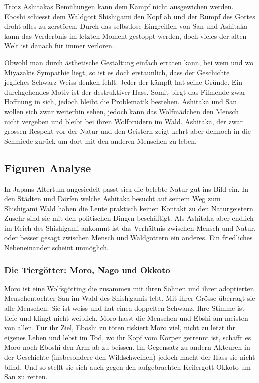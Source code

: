 Trotz Ashitakas Bemühungen kann dem Kampf nicht ausgewichen werden. Eboshi schiesst dem Waldgott Shishigami den Kopf ab und der Rumpf des Gottes droht alles zu zerstören. Durch das selbstlose Eingreiffen von San und Ashitaka kann das Verderbnis im letzten Moment gestoppt werden, doch vieles der alten Welt ist danach für immer verloren.

Obwohl man durch ästhetische Gestaltung einfach erraten kann, bei wem und wo Miyazakis Sympathie liegt, so ist es doch erstaunlich, dass der Geschichte jegliches Schwarz-Weiss denken fehlt. Jeder der kämpft hat seine Gründe. Ein durchgehendes Motiv ist der destruktiver Hass. Somit birgt das Filmende zwar Hoffnung in sich, jedoch bleibt die Problematik bestehen. Ashitaka und San wollen sich zwar weiterhin sehen, jedoch kann das Wolfmädchen den Mensch nicht vergeben und bleibt bei ihren Wolfbrüdern im Wald. Ashitaka, der zwar grossen Respekt vor der Natur und den Geistern zeigt kehrt aber dennoch in die Schmiede zurück um dort mit den anderen Menschen zu leben.  

\subsection{Figuren Analyse}
In Japans Altertum angesiedelt passt sich die belebte Natur gut ins Bild ein. In den Städten und Dörfen welche Ashitaka besucht auf seinem Weg zum Shishigami Wald haben die Leute praktisch keinen Kontakt zu den Naturgeistern. Zusehr sind sie mit den politischen Dingen beschäftigt. Als Ashitaka aber endlich im Reich des Shishigami ankommt ist das Verhältnis zwischen Mensch und Natur, oder besser gesagt zwischen Mensch und Waldgöttern ein anderes. Ein friedliches Nebeneinander scheint unmöglich.

\subsubsection*{Die Tiergötter: Moro, Nago und Okkoto}
Moro ist eine Wolfsgötting die zusammen mit ihren Söhnen und ihrer adoptierten Menschentochter San im Wald des Shishigamis lebt. Mit ihrer Grösse überragt sie alle Menschen. Sie ist weiss und hat einen doppelten Schwanz. Ihre Stimme ist tiefe und klingt nicht weiblich. Moro hasst die Menschen und Ebshi am meisten von allen. Für ihr Ziel, Eboshi zu töten riskiert Moro viel, nicht zu letzt ihr eigenes Leben und lebst im Tod, wo ihr Kopf vom Körper getrennt ist, schafft es Moro noch Eboshi den Arm ab zu beissen. Im Gegensatz zu andern Akteuren in der Geschichte (insbesondere den Wildschweinen) jedoch macht der Hass sie nicht blind. Und so stellt sie sich auch gegen den aufgebrachten Keilergott Okkoto um San zu retten.

